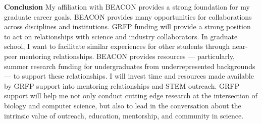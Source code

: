 \textbf{Conclusion}
My affiliation with BEACON provides a strong foundation for my graduate career goals.
BEACON provides many opportunities for collaborations across disciplines and institutions.
GRFP funding will provide a strong position to act on relationships with science and industry collaborators.
In graduate school, I want to facilitate similar experiences for other students through near-peer mentoring relationships.
BEACON provides resources --- particularly, summer research funding for undergraduates from underrepresented backgrounds --- to support these relationships.
I will invest time and resources made available by GRFP support into mentoring relationships and STEM outreach.
GRFP support will help me not only conduct cutting edge research at the intersection of biology and computer science, but also to lead in the conversation about the intrinsic value of outreach, education, mentorship, and community in science.
